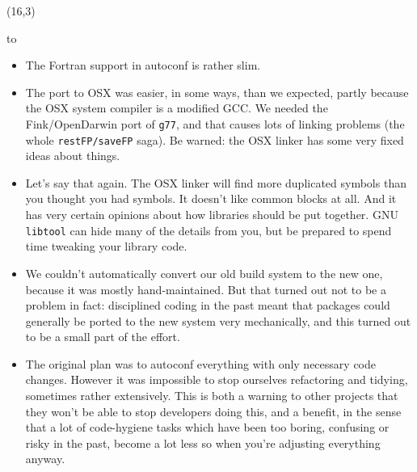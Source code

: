\documentclass[a0,portrait]{a0poster-ng}
\def\RHead#1{\noindent\hbox to \hsize{\hfil{\LARGE\color{DarkBlue} #1\par}}\bigskip}
\let\Head\RHead
\begin{document}
%


\begin{textblock}{7}(16,3)

\Head{Lessons and Warnings}

\begin{itemize}
\item The Fortran support in autoconf is rather slim.

\item The port to OSX was easier, in some ways, than we expected,
  partly because the OSX system compiler is a modified GCC.  We needed
  the Fink/OpenDarwin port of \texttt{g77}, and that causes lots of
  linking problems (the whole \texttt{restFP/saveFP} saga).  Be
  warned: the OSX linker has some very fixed ideas about things.

\item Let's say that again.  The OSX linker will find more duplicated
  symbols than you thought you had symbols.  It doesn't like common
  blocks at all.  And it has very certain opinions about how libraries
  should be put together.  GNU \texttt{libtool} can hide many of the
  details from you, but be prepared to spend time tweaking your library code.

\item We couldn't automatically convert our old build system to the
  new one, because it was mostly hand-maintained.  But that turned out
  not to be a problem in fact: disciplined coding in the past meant
  that packages could
  generally be ported to the new system very mechanically, and this
  turned out to be a small part of the effort.

\item The original plan was to autoconf everything with only necessary
  code changes.  However it was impossible to stop ourselves
  refactoring and tidying, sometimes rather extensively.  This is
  both a warning to other projects that they won't be able to stop
  developers doing this, and a benefit, in the sense that a lot of
  code-hygiene tasks which have been too boring, confusing or risky in
  the past, become a lot less so when you're adjusting everything
  anyway.


\end{itemize}
\end{textblock}
\end{document}
